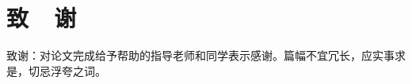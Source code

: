 \newpage
{}
{}
\section*{致~~谢}
\vspace*{-2mm}
\setlength{\baselineskip}{25pt}

致谢：对论文完成给予帮助的指导老师和同学表示感谢。篇幅不宜冗长，应实事求是，切忌浮夸之词。






\label{thanks}  %



